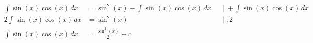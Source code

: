 \documentclass[preview]{standalone}
\begin{document}
\begin{align*}
\int \sin(x)\cos(x) \, dx &= \sin^2(x) - \int \sin(x)\cos(x) \, dx & &|\; + \int \sin(x)\cos(x) \, dx \\ 2\int \sin(x)\cos(x)\, dx&= \sin^2(x) & &|\; :2\\ \int \sin(x)\cos(x)\, dx &= \frac{\sin^2(x)}{2} + c
\end{align*}
\end{document}
